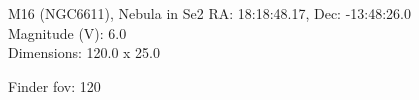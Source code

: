 \begin{block}{M16 (NGC6611), Nebula in Se2}
    RA: 18:18:48.17, Dec: -13:48:26.0 \\ 
    Magnitude (V): 6.0 \\ 
    Dimensions: 120.0 x 25.0 

    Finder fov: 120 
\end{block}